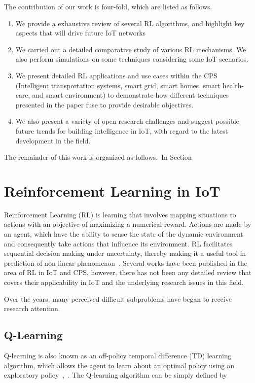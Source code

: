 \documentclass[journal]{IEEEtran}
\begin{document}
The contribution of our work is four-fold, which are listed as follows.
\indent
    \begin{enumerate}[leftmargin=*,label= \arabic*)]
      \item We provide a exhaustive review of several RL algorithms, and highlight key aspects that will drive future IoT networks

      \item We carried out a detailed comparative study of various RL mechanisms. We also perform simulations on some techniques considering some IoT scenarios.

      \item We present detailed RL applications and use cases within the CPS (Intelligent transportation systems, smart grid, smart homes, smart health-care, and smart environment) to demonstrate how different techniques presented in the paper fuse to provide desirable objectives.

      \item  We also present a variety of open research challenges and suggest possible future trends for building intelligence in IoT,
      with regard to the latest development in the field.
    \end{enumerate}


The remainder of this work is organized as follows.~In Section

\section{Reinforcement Learning in IoT}\label{sec:RLIoT}
Reinforcement Learning (RL) is learning that involves mapping situations to actions with an objective of maximizing a numerical reward. Actions are made by an agent, which have the ability to sense the state of the dynamic environment and consequently take actions that influence its environment. RL facilitates sequential decision making under uncertainty, thereby making it a useful tool in prediction of non-linear phenomenon~\cite{Zhang18}. Several works have been published in the area of RL in IoT and CPS, however, there has not been any detailed review that covers their applicability in IoT and the underlying research issues in this field.

Over the years, many perceived difficult subproblems have began to receive research attention.


\subsection{Q-Learning}
Q-learning is also known as an off-policy temporal difference (TD) learning algorithm, which allows the agent to learn about an optimal policy using an exploratory policy~\cite{Wen15},~\cite{Sutton98}. The Q-learning algorithm can be simply defined by
\end{document}
